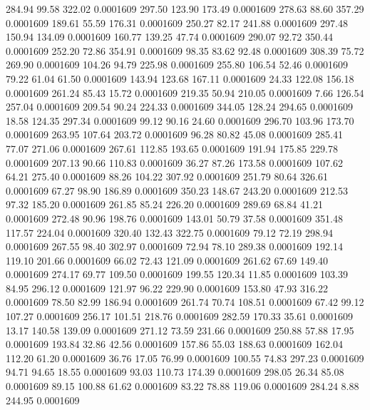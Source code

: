  284.94   99.58  322.02   0.0001609
 297.50  123.90  173.49   0.0001609
 278.63   88.60  357.29   0.0001609
 189.61   55.59  176.31   0.0001609
 250.27   82.17  241.88   0.0001609
 297.48  150.94  134.09   0.0001609
 160.77  139.25   47.74   0.0001609
 290.07   92.72  350.44   0.0001609
 252.20   72.86  354.91   0.0001609
  98.35   83.62   92.48   0.0001609
 308.39   75.72  269.90   0.0001609
 104.26   94.79  225.98   0.0001609
 255.80  106.54   52.46   0.0001609
  79.22   61.04   61.50   0.0001609
 143.94  123.68  167.11   0.0001609
  24.33  122.08  156.18   0.0001609
 261.24   85.43   15.72   0.0001609
 219.35   50.94  210.05   0.0001609
   7.66  126.54  257.04   0.0001609
 209.54   90.24  224.33   0.0001609
 344.05  128.24  294.65   0.0001609
  18.58  124.35  297.34   0.0001609
  99.12   90.16   24.60   0.0001609
 296.70  103.96  173.70   0.0001609
 263.95  107.64  203.72   0.0001609
  96.28   80.82   45.08   0.0001609
 285.41   77.07  271.06   0.0001609
 267.61  112.85  193.65   0.0001609
 191.94  175.85  229.78   0.0001609
 207.13   90.66  110.83   0.0001609
  36.27   87.26  173.58   0.0001609
 107.62   64.21  275.40   0.0001609
  88.26  104.22  307.92   0.0001609
 251.79   80.64  326.61   0.0001609
  67.27   98.90  186.89   0.0001609
 350.23  148.67  243.20   0.0001609
 212.53   97.32  185.20   0.0001609
 261.85   85.24  226.20   0.0001609
 289.69   68.84   41.21   0.0001609
 272.48   90.96  198.76   0.0001609
 143.01   50.79   37.58   0.0001609
 351.48  117.57  224.04   0.0001609
 320.40  132.43  322.75   0.0001609
  79.12   72.19  298.94   0.0001609
 267.55   98.40  302.97   0.0001609
  72.94   78.10  289.38   0.0001609
 192.14  119.10  201.66   0.0001609
  66.02   72.43  121.09   0.0001609
 261.62   67.69  149.40   0.0001609
 274.17   69.77  109.50   0.0001609
 199.55  120.34   11.85   0.0001609
 103.39   84.95  296.12   0.0001609
 121.97   96.22  229.90   0.0001609
 153.80   47.93  316.22   0.0001609
  78.50   82.99  186.94   0.0001609
 261.74   70.74  108.51   0.0001609
  67.42   99.12  107.27   0.0001609
 256.17  101.51  218.76   0.0001609
 282.59  170.33   35.61   0.0001609
  13.17  140.58  139.09   0.0001609
 271.12   73.59  231.66   0.0001609
 250.88   57.88   17.95   0.0001609
 193.84   32.86   42.56   0.0001609
 157.86   55.03  188.63   0.0001609
 162.04  112.20   61.20   0.0001609
  36.76   17.05   76.99   0.0001609
 100.55   74.83  297.23   0.0001609
  94.71   94.65   18.55   0.0001609
  93.03  110.73  174.39   0.0001609
 298.05   26.34   85.08   0.0001609
  89.15  100.88   61.62   0.0001609
  83.22   78.88  119.06   0.0001609
 284.24    8.88  244.95   0.0001609
